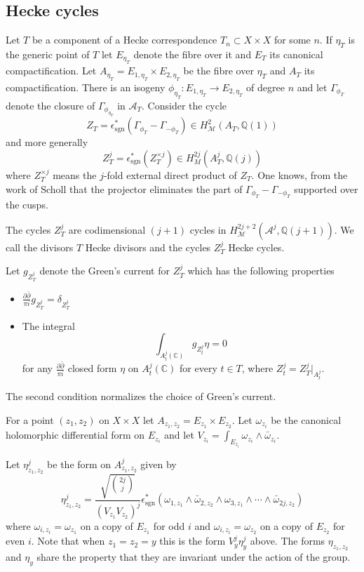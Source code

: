 \documentclass[11pt,a4paper]{article}
\newcommand {\C}{{\mathds C}}
\newcommand {\A}{{\mathcal A}}
\newcommand {\Q}{{\mathds Q}}
\newcommand {\M}{{\mathcal M}}
\def\sgn{\operatorname{sgn}}
\newcommand {\es}{{\epsilon^*_{\sgn}}}
\begin{document}
\subsection{Hecke cycles}
\label{heckecycles}

Let $T$ be a component of a Hecke correspondence $T_n \subset X \times X$ for some $n$. If $\eta_T$ is the generic point of $T$ let $E_{\eta_T}$ denote the fibre over it and $E_T$ its canonical compactification. Let $A_{\eta_T}=E_{1,\eta_T} \times E_{2,\eta_T}$ be the fibre over $\eta_T$ and $A_T$ its compactification. There is an isogeny $\phi_{\eta_T}:E_{1,\eta_T} \rightarrow E_{2,\eta_T}$ of degree $n$ and let $\Gamma_{\phi_T}$ denote the  closure of $\Gamma_{\phi_{\eta_T}}$  in $\A_T$. 
Consider the cycle 
%
$$Z_T=\es(\Gamma_{\phi_T}-\Gamma_{-\phi_T}) \in H^2_{\M}(A_T,\Q(1))$$
%
and more generally 
%
$$Z_T^j=\es(Z_T^{\times j}) \in H^{2j}_{M}(A_T^j,\Q(j))$$
%
where $Z_T^{\times j}$ means the $j$-fold external direct product of $Z_T$. One knows, from the work of Scholl \cite{schoMot} that the projector eliminates the part of $ \Gamma_{\phi_T}-\Gamma_{-\phi_T}$ supported over the cusps. 

The cycles $Z_T^j$ are codimensional $(j+1)$ cycles in $H^{2j+2}_{\M}(\A^j,\Q(j+1))$. 
We call the divisors $T$ Hecke divisors and the cycles $Z^j_T$ Hecke cycles.  


Let $g_{Z^j_T}$ denote the Green's current for  $Z^j_T$ which has the following properties 

\begin{itemize}
	
	\item $\frac{\partial \bar{\partial}}{\pi i} g_{Z^j_T} = \delta_{Z^j_T}$
	\item The integral 
	$$\int_{A_t^j(\C)} g_{Z^j_t} \eta=0$$
	for any $\frac{\partial \bar{\partial}}{\pi i}$ closed form $\eta$ on $A_t^j(\C)$ for every $t \in T$, where $Z^j_t=Z^j_T|_{A^j_t}$.
\end{itemize}
%
The second condition normalizes the choice of Green's current. 

For a point $(z_1,z_2)$ on $X \times X$ let $A_{z_1,z_2}=E_{z_1} \times E_{z_2}$. 
Let $\omega_{z_i}$ be the canonical holomorphic differential form on $E_{z_i}$ and let 
$V_{z_i}=\int_{E_{z_i}} \omega_{z_i} \wedge \bar{\omega}_{z_i}$. 

Let $\eta^j_{z_1,z_2}$ be the form on $A_{z_1,z_2}^j$ given by 
%
$$\eta^j_{z_1,z_2}=  \frac{\sqrt{\binom{2j}{j}}}{(V_{z_1}V_{z_2})^j}             \es(\omega_{1,z_1}\wedge \bar{\omega}_{2,z_2}\wedge \omega_{3,z_1}\wedge  \cdots \wedge \bar{\omega}_{2j,z_2})$$
%
where $\omega_{i,z_i}=\omega_{z_1}$ on a copy of  $E_{z_1}$ for odd $i$   and  $\omega_{i,z_i}=\omega_{z_2}$ on a copy of $E_{z_2}$ for even $i$.  Note that when $z_1=z_2=y$ this is  the form $V^j_y\eta^j_y$ above. The forms $\eta_{z_1,z_2}$ and $\eta_y$ share the property that they are invariant under the action of the group. 
\end{document}
